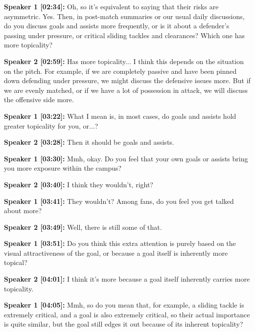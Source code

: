 \documentclass[11pt,a4paper]{article}
\begin{document}
\begin{linenumbers}
\vspace{0.5em}
\noindent \textbf{Speaker 1 [02:34]:} Oh, so it's equivalent to saying that their risks are asymmetric. Yes. Then, in post-match summaries or our usual daily discussions, do you discuss goals and assists more frequently, or is it about a defender's passing under pressure, or critical sliding tackles and clearances? Which one has more topicality?

\vspace{0.5em}
\noindent \textbf{Speaker 2 [02:59]:} Has more topicality... I think this depends on the situation on the pitch. For example, if we are completely passive and have been pinned down defending under pressure, we might discuss the defensive issues more. But if we are evenly matched, or if we have a lot of possession in attack, we will discuss the offensive side more.

\vspace{0.5em}
\noindent \textbf{Speaker 1 [03:22]:} What I mean is, in most cases, do goals and assists hold greater topicality for you, or...?

\vspace{0.5em}
\noindent \textbf{Speaker 2 [03:28]:} Then it should be goals and assists.

\vspace{0.5em}
\noindent \textbf{Speaker 1 [03:30]:} Mmh, okay. Do you feel that your own goals or assists bring you more exposure within the campus?

\vspace{0.5em}
\noindent \textbf{Speaker 2 [03:40]:} I think they wouldn't, right?

\vspace{0.5em}
\noindent \textbf{Speaker 1 [03:41]:} They wouldn't? Among fans, do you feel you get talked about more?

\vspace{0.5em}
\noindent \textbf{Speaker 2 [03:49]:} Well, there is still some of that.

\vspace{0.5em}
\noindent \textbf{Speaker 1 [03:51]:} Do you think this extra attention is purely based on the visual attractiveness of the goal, or because a goal itself is inherently more topical?

\vspace{0.5em}
\noindent \textbf{Speaker 2 [04:01]:} I think it's more because a goal itself inherently carries more topicality.

\vspace{0.5em}
\noindent \textbf{Speaker 1 [04:05]:} Mmh, so do you mean that, for example, a sliding tackle is extremely critical, and a goal is also extremely critical, so their actual importance is quite similar, but the goal still edges it out because of its inherent topicality?


\end{linenumbers}
\end{document}

